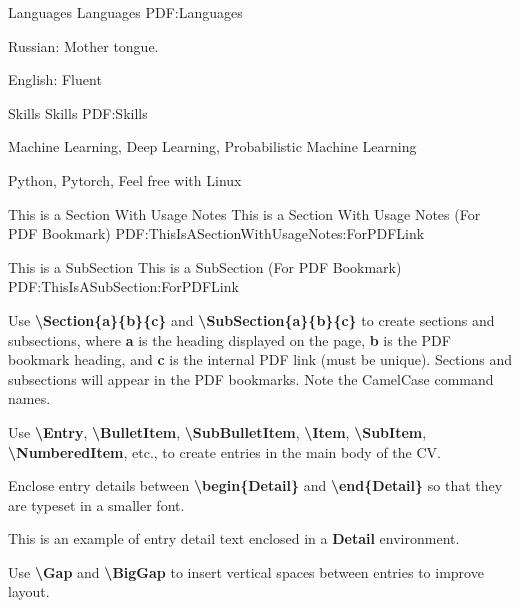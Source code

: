 \documentclass[letterpaper,MMMyyyy,nonstopmode]{simpleresumecv}
\newcommand{\Code}[1]{\mbox{\textbf{#1}}}
\newcommand{\CodeCommand}[1]{\mbox{\textbf{\textbackslash{#1}}}}
\begin{document}
\begin{Body}
\Section
{Languages}
{Languages}
{PDF:Languages}

\BulletItem
Russian: Mother tongue.

\Gap
\BulletItem
English: Fluent


\Section
{Skills}
{Skills}
{PDF:Skills}

\BulletItem
Machine Learning, Deep Learning, Probabilistic Machine Learning

\BulletItem
Python, Pytorch, Feel free with Linux
\fi

\iffalse

\begingroup
\color{red}

\Section
{This is a\newline
Section\newline
With\newline
Usage Notes}
{This is a Section With Usage Notes (For PDF Bookmark)}
{PDF:ThisIsASectionWithUsageNotes:ForPDFLink}

\SubSection
{This is a SubSection}
{This is a SubSection (For PDF Bookmark)}
{PDF:ThisIsASubSection:ForPDFLink}

\Gap
\BulletItem
Use \CodeCommand{Section\{a\}\{b\}\{c\}} and
\CodeCommand{SubSection\{a\}\{b\}\{c\}}
to create sections and subsections, where
\Code{a} is the heading displayed on the page,
\Code{b} is the PDF bookmark heading, and
\Code{c} is the internal PDF link (must be unique).
Sections and subsections will appear in the PDF bookmarks.
Note the CamelCase command names.

\Gap
\BulletItem
Use
\CodeCommand{Entry},
\CodeCommand{BulletItem},
\CodeCommand{SubBulletItem},
\CodeCommand{Item},
\CodeCommand{SubItem},
\CodeCommand{NumberedItem},
etc.,
to create entries in the main body of the CV.

\Gap
\BulletItem
Enclose entry details between
\CodeCommand{begin\{Detail\}} and
\CodeCommand{end\{Detail\}}
so that they are typeset in a smaller font.
\begin{Detail}
\Item
This is an example of entry detail text enclosed in a \Code{Detail} environment.
\end{Detail}

\Gap
\BulletItem
Use \CodeCommand{Gap} and \CodeCommand{BigGap} to insert vertical spaces between entries to improve layout.


\end{Body}
\end{document}
